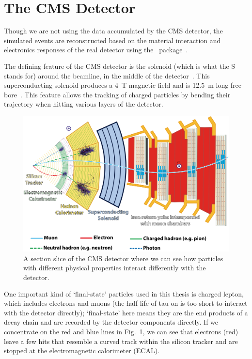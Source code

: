 \section{The CMS Detector}
Though we are not using the data accumulated by the CMS detector, the simulated events are
reconstructed based on the material interaction and electronics responses of the real detector using the
\gf~package~\cite{geant4}.

The defining feature of the CMS detector is the solenoid (which is what the S stands for) around the beamline, in the
middle of the detector~\cite{solenoid_map}.
This superconducting solenoid produces a \SI{4}{\tesla} magnetic field and is 
\SI{12.5}{\meter} long free bore~\cite{solenoid_map}. This feature allows the tracking of
charged particles by bending their trajectory when hitting various layers of the detector.


\begin{figure}[htb]
\begin{center}
\includegraphics[width=.75\linewidth]{fig/CMS_Slice.png}
\end{center}
\caption{A section slice of the CMS detector where we can see how 
particles with different physical properties interact differently with the detector.\protect\footnotemark}
\label{fig:CMS_Slice}
\end{figure}

One important kind of `final-state' particles used in this thesis is charged lepton, 
which includes electrons and muons (the half-life of tau-on is too short to interact with
the detector directly);
`final-state' here means they are the end products of a decay chain and are recorded by the detector
components directly. If we concentrate on the red and blue lines in Fig.~\ref{fig:CMS_Slice}, we
can see that electrons (red) leave a few hits that resemble a curved
track within the silicon tracker and are stopped at the electromagnetic calorimeter
(ECAL). 

